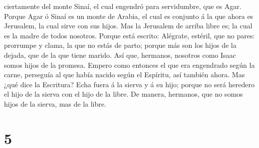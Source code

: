ciertamente del monte Sinaí, el cual engendró para servidumbre, que es
Agar.  Porque Agar ó Sinaí es un monte de Arabia, el cual
es conjunto á la que ahora es Jerusalem, la cual sirve con sus hijos.
 Mas la Jerusalem de arriba libre es; la cual es la madre
de todos nosotros.  Porque está escrito: Alégrate, estéril,
que no pares: prorrumpe y clama, la que no estás de parto; porque más
son los hijos de la dejada, que de la que tiene marido. 
Así que, hermanos, nosotros como Isaac somos hijos de la promesa.
 Empero como entonces el que era engendrado según la carne,
perseguía al que había nacido según el Espíritu, así también ahora.
 Mas ¿qué dice la Escritura? Echa fuera á la sierva y á su
hijo; porque no será heredero el hijo de la sierva con el hijo de la
libre.  De manera, hermanos, que no somos hijos de la
sierva, mas de la libre.

\hypertarget{section-4}{%
\section{5}\label{section-4}}


